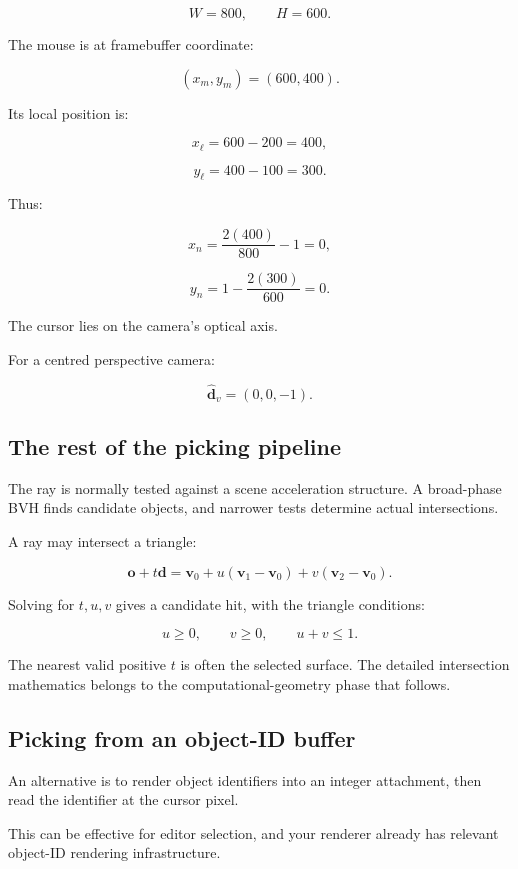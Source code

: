 \[ W=800,\qquad H=600. \]

The mouse is at framebuffer coordinate:

\[ (x_m,y_m)=(600,400). \]

Its local position is:

\[ x_\ell=600-200=400, \]

\[ y_\ell=400-100=300. \]

Thus:

\[ x_n=\frac{2(400)}{800}-1=0, \]

\[ y_n=1-\frac{2(300)}{600}=0. \]

The cursor lies on the camera's optical axis.

For a centred perspective camera:

\[ \boxed{ \hat{\mathbf d}_v=(0,0,-1). } \]

\subsection{The rest of the picking pipeline}\label{02-foundations-ii-ch035-the-rest-of-the-picking-pipeline}

The ray is normally tested against a scene acceleration structure. A broad-phase BVH finds candidate objects, and narrower tests determine actual intersections.

A ray may intersect a triangle:

\[ \mathbf o+t\mathbf d = \mathbf v_0+ u(\mathbf v_1-\mathbf v_0)+ v(\mathbf v_2-\mathbf v_0). \]

Solving for \(t,u,v\) gives a candidate hit, with the triangle conditions:

\[ u\ge0,\qquad v\ge0,\qquad u+v\le1. \]

The nearest valid positive \(t\) is often the selected surface. The detailed intersection mathematics belongs to the computational-geometry phase that follows.

\subsection{Picking from an object-ID buffer}\label{02-foundations-ii-ch035-picking-from-an-object-id-buffer}

An alternative is to render object identifiers into an integer attachment, then read the identifier at the cursor pixel.

This can be effective for editor selection, and your renderer already has relevant object-ID rendering infrastructure.

